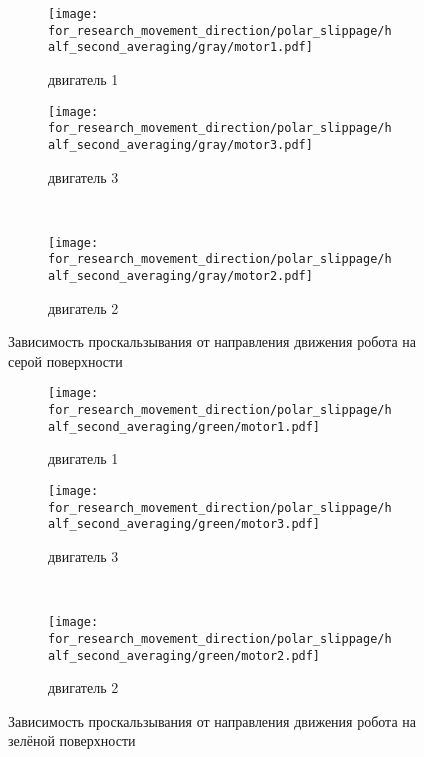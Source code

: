 \begin{figure}[H]
    \centering
    \begin{subfigure}{0.49\textwidth}
        \centering
        \texttt{[image: for\_research\_movement\_direction/polar\_slippage/half\_second\_averaging/gray/motor1.pdf]}
        \caption{двигатель 1}
    \end{subfigure}
    \hspace{0.005\textwidth}
    \begin{subfigure}{0.49\textwidth}
        \centering
        \texttt{[image: for\_research\_movement\_direction/polar\_slippage/half\_second\_averaging/gray/motor3.pdf]}
        \caption{двигатель 3}
    \end{subfigure} \\
    \vspace{4pt}
    \centering
    \begin{subfigure}{0.49\textwidth}
        \centering
        \texttt{[image: for\_research\_movement\_direction/polar\_slippage/half\_second\_averaging/gray/motor2.pdf]}
        \caption{двигатель 2}
    \end{subfigure}
    \caption{Зависимость проскальзывания от направления движения робота на серой поверхности}
\end{figure}

\begin{figure}[H]
    \centering
    \begin{subfigure}{0.49\textwidth}
        \centering
        \texttt{[image: for\_research\_movement\_direction/polar\_slippage/half\_second\_averaging/green/motor1.pdf]}
        \caption{двигатель 1}
    \end{subfigure}
    \hspace{0.005\textwidth}
    \begin{subfigure}{0.49\textwidth}
        \centering
        \texttt{[image: for\_research\_movement\_direction/polar\_slippage/half\_second\_averaging/green/motor3.pdf]}
        \caption{двигатель 3}
    \end{subfigure} \\
    \vspace{4pt}
    \centering
    \begin{subfigure}{0.49\textwidth}
        \centering
        \texttt{[image: for\_research\_movement\_direction/polar\_slippage/half\_second\_averaging/green/motor2.pdf]}
        \caption{двигатель 2}
    \end{subfigure}
    \caption{Зависимость проскальзывания от направления движения робота на зелёной поверхности}
\end{figure}

